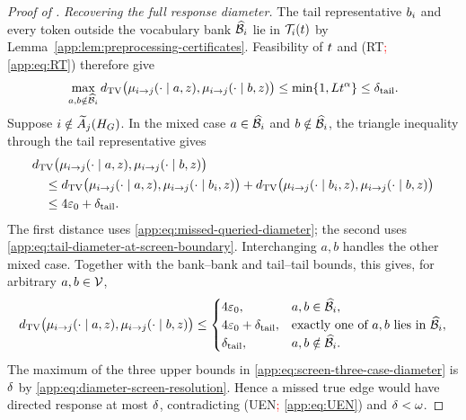 \begin{proof}[Proof of \AppLowDegreeScreenRef]
\emph{Recovering the full response diameter.}
The tail representative $b_{i}$ and every token outside
the vocabulary bank $\widehat{\mathcal B}_{i}$ lie in
$\mathcal T_{i}(t)$ by
Lemma~\ref{app:lem:preprocessing-certificates}.  Feasibility of
$t$ and (RT\textcolor{red}{; \cref{app:eq:RT}}) therefore give
\begin{equation}
 \max_{a,b\notin\widehat{\mathcal B}_{i}}
 d_{\mathrm{TV}}\bigl(\mu_{i\to j}(\cdot\mid a,z),
            \mu_{i\to j}(\cdot\mid b,z)\bigr)
 \le\min\{1,Lt^{\alpha}\}
 \le\delta_{\mathrm{tail}}.
 \label{app:eq:tail-diameter-at-screen-boundary}
\end{equation}
Suppose $i\notin\widetilde A_{j}(H_{G})$.  In the mixed case
$a\in\widehat{\mathcal B}_{i}$ and $b\notin\widehat{\mathcal B}_{i}$, the triangle inequality
through the tail representative gives
\begin{align*}
 &d_{\mathrm{TV}}\bigl(\mu_{i\to j}(\cdot\mid a,z),\mu_{i\to j}(\cdot\mid b,z)\bigr)\\
 &\quad\le
 d_{\mathrm{TV}}\bigl(\mu_{i\to j}(\cdot\mid a,z),
           \mu_{i\to j}(\cdot\mid b_{i},z)\bigr)
 +d_{\mathrm{TV}}\bigl(\mu_{i\to j}(\cdot\mid b_{i},z),
             \mu_{i\to j}(\cdot\mid b,z)\bigr)\\
 &\quad\le 4\varepsilon_0+\delta_{\mathrm{tail}}.
\end{align*}
The first distance uses \eqref{app:eq:missed-queried-diameter}; the second
uses \eqref{app:eq:tail-diameter-at-screen-boundary}.  Interchanging $a,b$
handles the other mixed case.  Together with the bank--bank and tail--tail
bounds, this gives, for arbitrary $a,b\in\mathcal V$,
\begin{equation}
 d_{\mathrm{TV}}\bigl(\mu_{i\to j}(\cdot\mid a,z),
            \mu_{i\to j}(\cdot\mid b,z)\bigr)
 \le
 \begin{cases}
  4\varepsilon_0,&a,b\in\widehat{\mathcal B}_{i},\\
  4\varepsilon_0+\delta_{\mathrm{tail}},
    &\text{exactly one of $a,b$ lies in }\widehat{\mathcal B}_{i},\\
  \delta_{\mathrm{tail}},&a,b\notin\widehat{\mathcal B}_{i}.
 \end{cases}
 \label{app:eq:screen-three-case-diameter}
\end{equation}
The maximum of the three upper bounds in
\eqref{app:eq:screen-three-case-diameter} is $\delta$ by
\eqref{app:eq:diameter-screen-resolution}.  Hence a missed true edge would
have directed response at most $\delta$, contradicting (UEN\textcolor{red}{; \cref{app:eq:UEN}}) and
$\delta<\omega$.


\end{proof}
